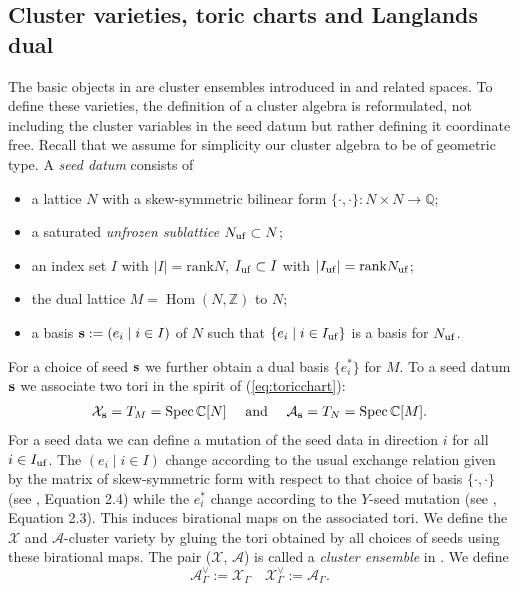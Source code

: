 \documentclass{emsprocart}
\theoremstyle{definition}
\newcommand{\Hom}{\operatorname{Hom}}
\begin{document}
\subsection{Cluster varieties, toric charts and Langlands dual}\label{LLdual}
The basic objects in \cite{GHKK} are cluster ensembles introduced in \cite{FG} and related spaces. To define these varieties, the definition of a cluster algebra is reformulated, not including the cluster variables in the seed datum but rather defining it coordinate free. 
Recall that we assume for simplicity our cluster algebra to be of geometric type.  A {\it seed datum} consists of
\begin{itemize}
\item a lattice $N$ with a skew-symmetric bilinear form $\{\cdot, \cdot\}: N \times N \rightarrow \mathbb{Q}$;
\item a saturated {\it unfrozen sublattice} $N_{\rm uf}\subset N$;
\item an index set $I$ with $|I|=\text{rank}N$, $I_{\rm uf}\subset I$ with $|I_{\rm uf}|=\text{rank}N_{\rm uf}$;
\item the dual lattice $M=\Hom(N,\mathbb{Z})$ to $N$;
\item a basis ${\bf s}:=(e_i \mid i \in I)$ of $N$ such that $\{e_i \mid i \in I_{\rm uf}\}$ is a basis for $N_{\rm uf}$.
\end{itemize}
For a choice of seed ${\bf s}$ we further obtain a dual basis $\{{e_i^*}\}$ for $M$.
To a seed datum ${\bf s}$ we associate two tori in the spirit of (\ref{eq:toricchart}):
$$\begin{matrix}
{\mathcal X}_{\bf s}=T_M=\text{Spec\,}\mathbb{C}[N] &  \text{ and } & {\mathcal A}_{\bf s}=T_N=\text{Spec\,}\mathbb{C}[M].
\end{matrix}$$
For a seed data we can define a mutation of the seed data in direction $i$ for all $i \in I_{\rm uf}$. The $(e_i \mid i \in I)$ change according to the usual exchange relation given by the matrix of skew-symmetric form with respect to that choice of basis $\{\cdot, \cdot\}$ (see \cite{FZ2}, Equation 2.4) while the ${e_i^{*}}$ change according to the $Y$-seed mutation (see \cite{FZ2}, Equation 2.3). This induces birational maps on the associated tori. We define the $\mathcal X$ and $\mathcal A$-cluster variety by gluing the tori obtained by all choices of seeds using these birational maps. The pair ($\mathcal X$, $\mathcal A$) is called a {\it cluster ensemble} in \cite{FG}. We define
\begin{equation}\label{dualFGvariety}
{\mathcal A}_\Gamma^\vee :={\mathcal X}_{\Gamma}  \quad 
{\mathcal X}_\Gamma^\vee :={\mathcal A}_{\Gamma}.
\end{equation}
\end{document}

